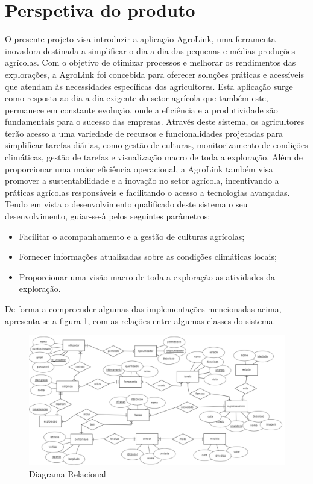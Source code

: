\documentclass{scrreprt}
\begin{document}
	\section{Perspetiva do produto}
	O presente projeto visa introduzir a aplicação AgroLink, uma ferramenta inovadora destinada a simplificar o dia a dia das pequenas e médias produções agrícolas. Com o objetivo de otimizar processos e melhorar os rendimentos das explorações, a AgroLink foi concebida para oferecer soluções práticas e acessíveis que atendam às necessidades específicas dos agricultores.
	Esta aplicação surge como resposta ao dia a dia exigente do setor agrícola que também este, permanece em constante evolução, onde a eficiência e a produtividade são fundamentais para o sucesso das empresas. Através deste sistema, os agricultores terão acesso a uma variedade de recursos e funcionalidades projetadas para simplificar tarefas diárias, como gestão de culturas, monitorizamento de condições climáticas, gestão de tarefas e visualização macro de toda a exploração.
	Além de proporcionar uma maior eficiência operacional, a AgroLink também visa promover a sustentabilidade e a inovação no setor agrícola, incentivando a práticas agrícolas responsáveis e facilitando o acesso a tecnologias avançadas.
	Tendo em vista o desenvolvimento qualificado deste sistema o seu desenvolvimento, guiar-se-à pelos seguintes parâmetros:
	\begin{itemize}
		\item Facilitar o acompanhamento e a gestão de culturas agrícolas;
		\item Fornecer informações atualizadas sobre as condições climáticas locais;
		\item Proporcionar uma visão macro de toda a exploração as atividades da exploração. 
	\end{itemize}
	De forma a compreender algumas das implementações mencionadas acima, apresenta-se a figura \ref{fig:diagramarelacional}, com as relações entre algumas classes do sistema. 
	
	\begin{figure}[!h]
		\centering
		\includegraphics[width=0.9\linewidth]{DiagramaRelacional.png}
		\caption{Diagrama Relacional}
		\label{fig:diagramarelacional}
	\end{figure}
\end{document}
